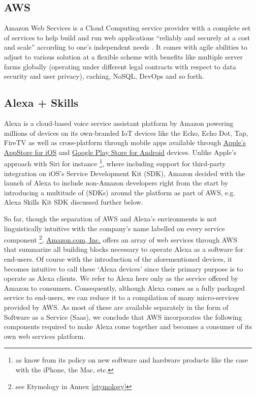 \subsection*{AWS}
Amazon Web Services is a Cloud Computing service provider with a complete set of services to help build and run web applications ``reliably and securely at a cost and scale'' according to one's independent needs \cite{aws_website}.
It comes with agile abilities to adjust to various solution at a flexible scheme with benefits like multiple server farms globally (operating under different legal contracts with respect to data security and user privacy), caching, NoSQL, DevOps and so forth.


\subsection*{Alexa + Skills}
\label{alexa:def}
Alexa is a cloud-based voice service assistant platform by Amazon powering millions of devices  on its own-branded IoT devices like the Echo, Echo Dot, Tap, FireTV as well as cross-platform through mobile apps available through  \href{https://itunes.apple.com/de/app/amazon-alexa/id944011620?l=en&mt=8}{Apple's AppStore for iOS} and  \href{https://play.google.com/store/apps/details?id=com.amazon.dee.app&hl=en}{Google Play Store for Android} devices. Unlike Apple's approach with Siri for instance \footnote{as know from its policy on  new software and hardware products like the case with the iPhone, the Mac, etc.}, where including support for third-party integration on iOS's Service Development Kit (SDK), Amazon decided with the launch of Alexa to include non-Amazon developers right from the start by introducing a multitude of (SDKs) around the platform as part of AWS, e.g. Alexa Skills Kit SDK discussed further below.

So far, though the separation of AWS and Alexa's environments is not linguistically intuitive with the company's name labelled on every service component \footnote{see Etymology in Annex \ref{etymology}}, \href{http://www.amazon.com}{Amazon.com, Inc.} offers an array of web services through AWS that summarize all building blocks necessary to operate Alexa as a software for end-users. Of course with the introduction of the aforementioned devices, it becomes intuitive to call these `Alexa devices' since their primary purpose is to operate as Alexa clients. We refer to Alexa here only as the service offered by Amazon to consumers. Consequently, although Alexa comes as a fully packaged service to end-users, we can reduce it to a compilation of many micro-services provided by AWS. As most of these are available separately in the form of Software as a Service (Saas), we conclude that AWS incorporates the following components required to make Alexa come together and becomes a consumer of its own web services platform. 





